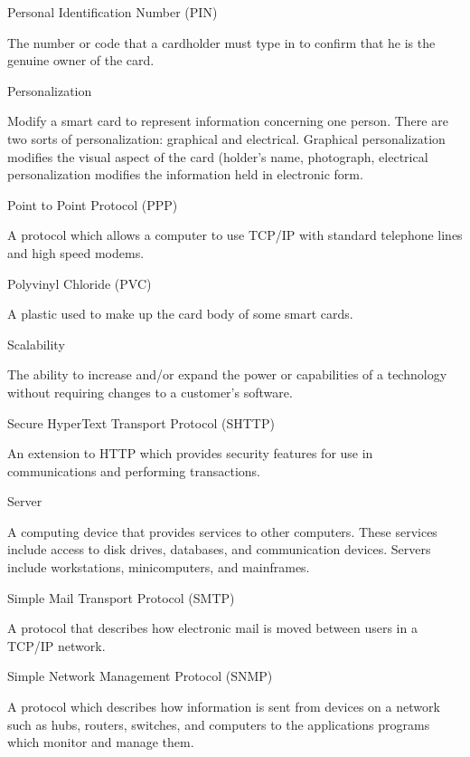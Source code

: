 \begin{htmllist}
\item[Personal Identification Number (PIN)]

The number or code that a cardholder must type in to confirm that he is
the genuine owner of the card.


\item[Personalization]

Modify a smart card to represent information concerning one person.
There are two sorts of personalization: graphical and electrical.
Graphical personalization modifies the visual aspect of the card
(holder's name, photograph, electrical personalization modifies the
information held in electronic form.


\item[Point to Point Protocol (PPP)]

A protocol which allows a computer to use TCP/IP with standard
telephone lines and high speed modems.


\item[Polyvinyl Chloride (PVC)]

A plastic used to make up the card body of some smart cards.


\item[Scalability]

The ability to increase and/or expand the power or capabilities of a
technology without requiring changes to a customer's software.


\item[Secure HyperText Transport Protocol (SHTTP)]

An extension to HTTP which provides security features for use in
communications and performing transactions.


\item[Server]

A computing device that provides services to other computers. These
services include access to disk drives, databases, and communication
devices. Servers include workstations, minicomputers, and mainframes.


\item[Simple Mail Transport Protocol (SMTP)]

A protocol that describes how electronic mail is moved between users in
a TCP/IP network.


\item[Simple Network Management Protocol (SNMP)]

A protocol which describes how information is sent from devices on a
network such as hubs, routers, switches, and computers to the
applications programs which monitor and manage them.



\end{htmllist}
